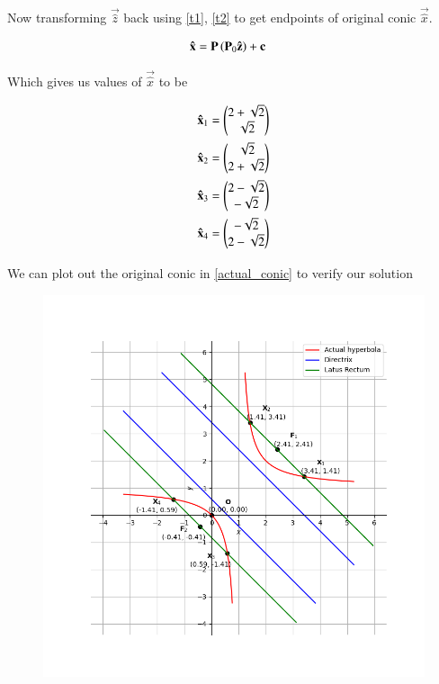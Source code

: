 \documentclass[journal]{IEEEtran}
\begin{document}


Now transforming $\vec{\hat{z}}$ back using \eqref{t1}, \eqref{t2} to get endpoints of original conic $\vec{\hat{x}}$.

\begin{align}
	\mathbf{\hat{x}} &= \mathbf{P}\left(\mathbf{P}_0 \mathbf{\hat{z}}\right) + \mathbf{c}
\end{align}

Which gives us values of $\vec{\hat{x}}$ to be

\begin{align*}
	\mathbf{\hat{x}}_1 &= \begin{pmatrix}2+\sqrt{2} \\ \sqrt{2}\end{pmatrix}\\
	\mathbf{\hat{x}}_2 &= \begin{pmatrix}\sqrt{2} \\ 2+\sqrt{2}\end{pmatrix}\\
	\mathbf{\hat{x}}_3 &= \begin{pmatrix}2-\sqrt{2} \\ -\sqrt{2}\end{pmatrix}\\
	\mathbf{\hat{x}}_4 &= \begin{pmatrix}-\sqrt{2} \\ 2-\sqrt{2}\end{pmatrix}
\end{align*}

We can plot out the original conic in \eqref{actual_conic} to verify our solution

\begin{figure}[H]
	\centering
	\includegraphics[width=0.75\columnwidth]{Figures/Hyperbola.png} 
	\caption{}
	\label{fig:Hyperbola}
\end{figure}
\end{document}
